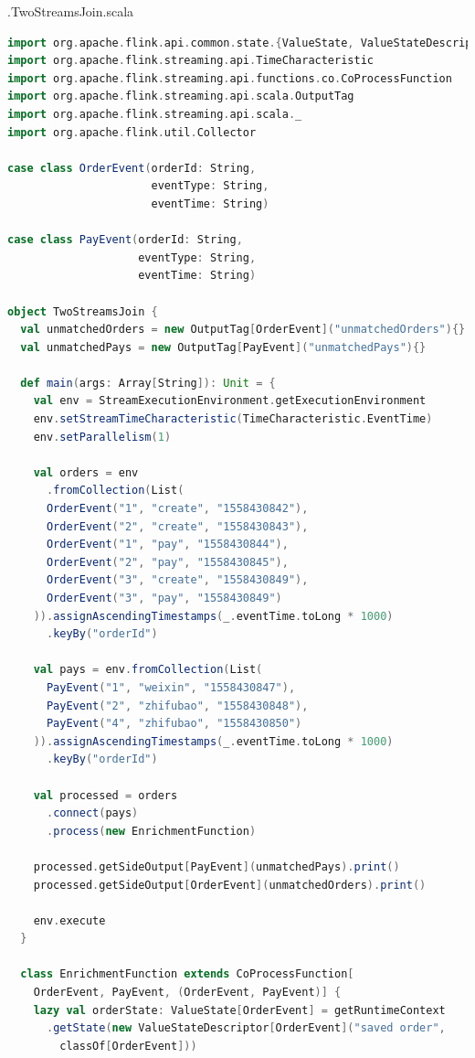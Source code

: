\documentclass[oneside]{ctexbook}
\begin{document}
.TwoStreamsJoin.scala
\begin{lstlisting}[language=scala]
import org.apache.flink.api.common.state.{ValueState, ValueStateDescriptor}
import org.apache.flink.streaming.api.TimeCharacteristic
import org.apache.flink.streaming.api.functions.co.CoProcessFunction
import org.apache.flink.streaming.api.scala.OutputTag
import org.apache.flink.streaming.api.scala._
import org.apache.flink.util.Collector

case class OrderEvent(orderId: String,
                      eventType: String,
                      eventTime: String)

case class PayEvent(orderId: String,
                    eventType: String,
                    eventTime: String)

object TwoStreamsJoin {
  val unmatchedOrders = new OutputTag[OrderEvent]("unmatchedOrders"){}
  val unmatchedPays = new OutputTag[PayEvent]("unmatchedPays"){}

  def main(args: Array[String]): Unit = {
    val env = StreamExecutionEnvironment.getExecutionEnvironment
    env.setStreamTimeCharacteristic(TimeCharacteristic.EventTime)
    env.setParallelism(1)

    val orders = env
      .fromCollection(List(
      OrderEvent("1", "create", "1558430842"),
      OrderEvent("2", "create", "1558430843"),
      OrderEvent("1", "pay", "1558430844"),
      OrderEvent("2", "pay", "1558430845"),
      OrderEvent("3", "create", "1558430849"),
      OrderEvent("3", "pay", "1558430849")
    )).assignAscendingTimestamps(_.eventTime.toLong * 1000)
      .keyBy("orderId")

    val pays = env.fromCollection(List(
      PayEvent("1", "weixin", "1558430847"),
      PayEvent("2", "zhifubao", "1558430848"),
      PayEvent("4", "zhifubao", "1558430850")
    )).assignAscendingTimestamps(_.eventTime.toLong * 1000)
      .keyBy("orderId")

    val processed = orders
      .connect(pays)
      .process(new EnrichmentFunction)

    processed.getSideOutput[PayEvent](unmatchedPays).print()
    processed.getSideOutput[OrderEvent](unmatchedOrders).print()

    env.execute
  }

  class EnrichmentFunction extends CoProcessFunction[
    OrderEvent, PayEvent, (OrderEvent, PayEvent)] {
    lazy val orderState: ValueState[OrderEvent] = getRuntimeContext
      .getState(new ValueStateDescriptor[OrderEvent]("saved order",
        classOf[OrderEvent]))


\end{lstlisting}
\end{document}
